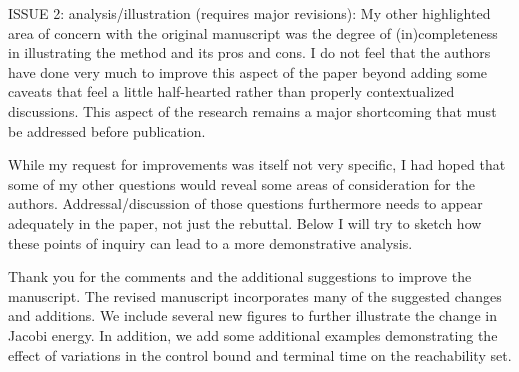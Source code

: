 \documentclass[11pt]{article}
\begin{document}
\begin{itshape}
ISSUE 2: analysis/illustration (requires major revisions): 
My other highlighted area of concern with the original manuscript was the degree of (in)completeness in illustrating the method and its pros and cons.  I do not feel that the authors have done very much to improve this aspect of the paper beyond adding some caveats that feel a little half-hearted rather than properly contextualized discussions.  This aspect of the research remains a major shortcoming that must be addressed before publication.  

While my request for improvements was itself not very specific, I had hoped that some of my other questions would reveal some areas of consideration for the authors.  Addressal/discussion of those questions furthermore needs to appear adequately in the paper, not just the rebuttal. Below I will try to sketch how these points of inquiry can lead to a more demonstrative analysis.
\end{itshape}
\newline\newline
Thank you for the comments and the additional suggestions to improve the manuscript.
The revised manuscript incorporates many of the suggested changes and additions.
We include several new figures to further illustrate the change in Jacobi energy.
In addition, we add some additional examples demonstrating the effect of variations in the control bound and terminal time on the reachability set.
\end{document}
